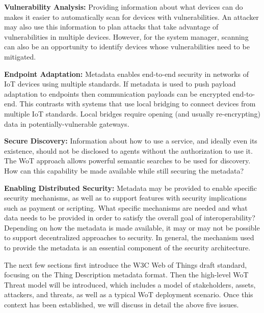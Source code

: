 \noindent\textbf{Vulnerability Analysis:}
Providing information about what devices can do makes it easier to 
automatically scan for devices with vulnerabilities.
An attacker may also use this information to plan attacks that take advantage of 
vulnerabilities in multiple devices. 
However, for the system manager, scanning can also be an opportunity 
to identify devices whose vulnerabilities need to be mitigated.


\noindent\textbf{Endpoint Adaptation:}
Metadata enables end-to-end security in networks of IoT devices using multiple standards.
If metadata is used to push payload adaptation to endpoints then 
communication payloads can be encrypted end-to-end.  
This contrasts with systems that use local bridging to connect devices from multiple IoT standards.
Local bridges require opening (and usually re-encrypting) data in potentially-vulnerable gateways.


\noindent\textbf{Secure Discovery:}
Information about how to use a service, 
and ideally even its existence, should not
be disclosed to agents without the authorization to use it.
The WoT approach allows powerful semantic searches to be used for discovery.
How can this capability be made available while still securing the metadata?


\noindent\textbf{Enabling Distributed Security:}
Metadata may be provided to enable specific security mechanisms,
as well as to support features with security implications such as payment or scripting.
What specific mechanisms are needed and what data needs to be provided
in order to satisfy the overall goal of interoperability?
Depending on how the metadata is made available, it may or may not be 
possible to support decentralized approaches to security.
In general, the mechanism used to provide the metadata is
an essential component of the security architecture.

The next few sections first introduce the W3C Web of Things draft standard,
focusing on the Thing Description metadata format.  
Then the high-level WoT Threat model will be introduced,
which includes a model of stakeholders, assets, attackers,
and threats, as well as a typical WoT deployment scenario.
Once this context has been established, we will discuss in detail the above
five issues.

